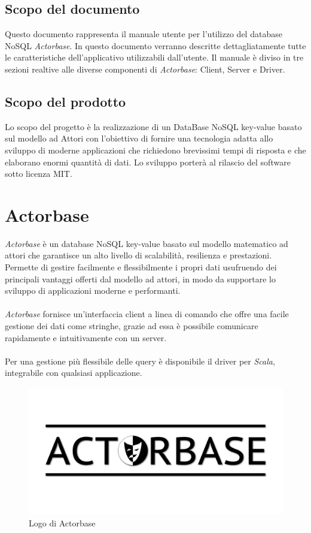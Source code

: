 \documentclass[a4paper]{article}
\begin{document}
	\subsection{Scopo del documento}
		Questo documento rappresenta il manuale utente per l'utilizzo del database NoSQL \emph{Actorbase}. In questo documento verranno descritte dettagliatamente tutte le caratteristiche dell’applicativo utilizzabili dall’utente. Il manuale è diviso in tre sezioni realtive alle diverse componenti di \emph{Actorbase}: Client, Server e Driver.
	\subsection{Scopo del prodotto}
		Lo scopo del progetto è la realizzazione di un DataBase NoSQL key-value basato sul modello ad 
		Attori con l'obiettivo di fornire una tecnologia adatta allo sviluppo di moderne 
		applicazioni che richiedono brevissimi tempi di risposta e che elaborano enormi quantità 
		di dati. Lo sviluppo porterà al rilascio del software sotto licenza MIT.

	\section{Actorbase}
	\emph{Actorbase} è un database NoSQL key-value basato sul modello matematico ad attori che garantisce un alto livello di scalabilità, resilienza e prestazioni. Permette di gestire facilmente e flessibilmente i propri dati usufruendo dei principali vantaggi offerti dal modello ad attori, in modo
	da supportare lo sviluppo di applicazioni moderne e performanti. 
	\\ \\
	\emph{Actorbase} fornisce un'interfaccia client a linea di comando che offre una facile gestione dei dati come stringhe, grazie ad essa è possibile comunicare rapidamente e intuitivamente con un server. 
	\\ \\
	Per una gestione più flessibile delle query è disponibile il driver per \emph{Scala}, integrabile con qualsiasi applicazione.
	\begin{figure}[H]
		\centering
		\includegraphics[scale=0.4]{actorbaseLogo.png}
		\caption{Logo di Actorbase}
	\end{figure}
\end{document}
